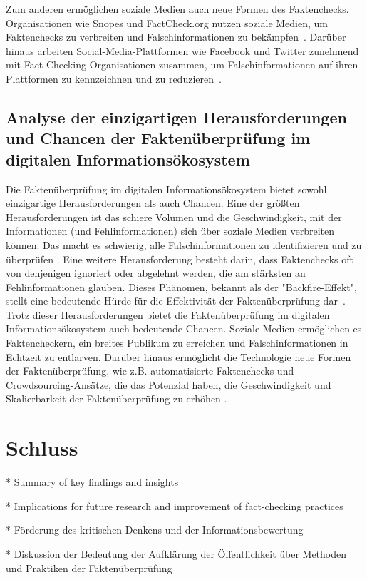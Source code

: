 \documentclass[a4paper,listof=totoc,bibliography=totoc]{scrartcl}
\begin{document}
Zum anderen ermöglichen soziale Medien auch neue Formen des Faktenchecks. Organisationen wie Snopes und FactCheck.org nutzen soziale Medien, um 
Faktenchecks zu verbreiten und Falschinformationen zu bekämpfen~\cite{Fung2012}. Darüber hinaus arbeiten Social-Media-Plattformen wie Facebook und 
Twitter zunehmend mit Fact-Checking-Organisationen zusammen, um Falschinformationen auf ihren Plattformen zu kennzeichnen und zu reduzieren~\cite{Pennycook2020}.

\subsection{Analyse der einzigartigen Herausforderungen und Chancen der Faktenüberprüfung im digitalen Informationsökosystem}

Die Faktenüberprüfung im digitalen Informationsökosystem bietet sowohl einzigartige Herausforderungen als auch Chancen. Eine der größten 
Herausforderungen ist das schiere Volumen und die Geschwindigkeit, mit der Informationen (und Fehlinformationen) sich über soziale Medien verbreiten 
können. Das macht es schwierig, alle Falschinformationen zu identifizieren und zu überprüfen \cite{Vosoughi2018}.
Eine weitere Herausforderung besteht darin, dass Faktenchecks oft von denjenigen ignoriert oder abgelehnt werden, die am stärksten 
an Fehlinformationen glauben. Dieses Phänomen, bekannt als der "Backfire-Effekt", stellt eine bedeutende Hürde für die Effektivität der Faktenüberprüfung dar~\cite{nyhan2010}.
Trotz dieser Herausforderungen bietet die Faktenüberprüfung im digitalen Informationsökosystem auch bedeutende Chancen. Soziale Medien ermöglichen es Faktencheckern, ein breites 
Publikum zu erreichen und Falschinformationen in Echtzeit zu entlarven. Darüber hinaus ermöglicht die Technologie neue Formen der Faktenüberprüfung, wie z.B. automatisierte Faktenchecks und Crowdsourcing-Ansätze, die das Potenzial haben, die Geschwindigkeit und Skalierbarkeit der Faktenüberprüfung zu erhöhen \cite{Hassan2015}.

\section{Schluss}

* Summary of key findings and insights

* Implications for future research and improvement of fact-checking practices

* Förderung des kritischen Denkens und der Informationsbewertung

* Diskussion der Bedeutung der Aufklärung der Öffentlichkeit über Methoden und Praktiken der Faktenüberprüfung
\newpage
{}

\end{document}
